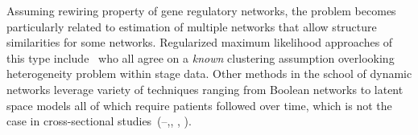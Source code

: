 \documentclass[10pt]{article}
\begin{document}
\medskip
Assuming rewiring property of gene regulatory networks, the problem becomes particularly related to estimation of multiple networks that allow structure similarities for some networks. Regularized maximum likelihood approaches of this type include~ \citet{Bilg2015,danaher2014joint,guo2011joint,zhu2014structural} who all agree on a \textit{known} clustering assumption overlooking heterogeneity problem within stage data. Other methods in the school of dynamic networks leverage variety of techniques ranging from Boolean networks to latent space models all of which require patients followed over time, which is not the case in cross-sectional studies~(\citet{bornholdt2000}--\citet{luan2003},\citet{hoff2002latent}, \citet{sarkar2005}, \citet{guo2007}). 


\end{document}
